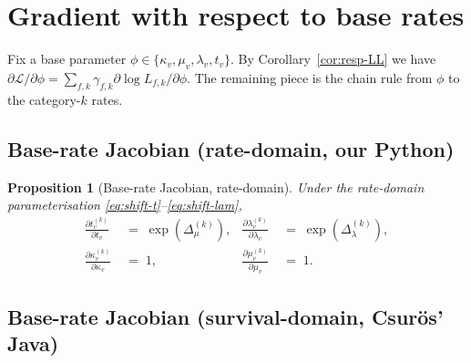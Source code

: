 \documentclass[11pt]{article}
\newcommand{\rate}{\kappa}
\newcommand{\dup}{\lambda}
\newcommand{\loss}{\mu}
\newcommand{\edgelen}{t}
\newcommand{\Ll}{\mathcal{L}}
\newtheorem{proposition}[theorem]{Proposition}
\theoremstyle{definition}
\begin{document}
\section{Gradient with respect to base rates}
\label{sec:base-grad}

Fix a base parameter $\phi \in \{\rate_v, \loss_v, \dup_v, \edgelen_v\}$.
By Corollary~\ref{cor:resp-LL} we have
$\partial\Ll/\partial\phi = \sum_{f,k}\gamma_{f,k}\partial\log L_{f,k}/\partial\phi$.
The remaining piece is the chain rule from $\phi$ to the
category-$k$ rates.

\subsection{Base-rate Jacobian (rate-domain, our Python)}

\begin{proposition}[Base-rate Jacobian, rate-domain]
\label{prop:base-jac-rate}
Under the rate-domain parameterisation
\eqref{eq:shift-t}--\eqref{eq:shift-lam},
\begin{align}
\frac{\partial \edgelen^{(k)}_v}{\partial \edgelen_v} \;&=\; \exp(\Delta_\loss^{(k)}),
&
\frac{\partial \dup^{(k)}_v}{\partial \dup_v} \;&=\; \exp(\Delta_\dup^{(k)}),
\nonumber\\
\frac{\partial \rate^{(k)}_v}{\partial \rate_v} \;&=\; 1,
&
\frac{\partial \loss^{(k)}_v}{\partial \loss_v} \;&=\; 1.
\label{eq:rate-jac}
\end{align}
\end{proposition}

\subsection{Base-rate Jacobian (survival-domain, Csurös' Java)}
\end{document}
